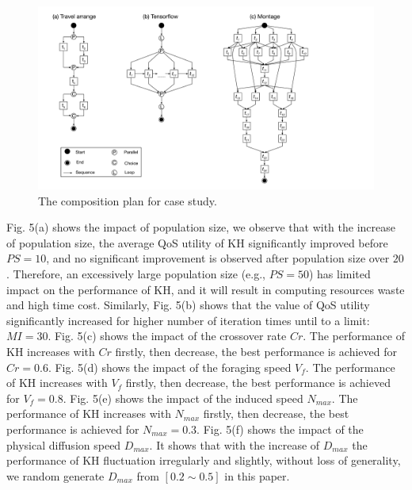 \documentclass[10pt,journal,compsoc]{IEEEtran}
\begin{document}
\begin{figure}[!t]
\centering
\includegraphics[width=5in]{./img/DAG.pdf}
\caption{The composition plan for case study.}
\label{fig_DAG}
\end{figure}

Fig. 5(a) shows the impact of population size, we observe that with the increase of population size, the average QoS utility of KH significantly improved before $PS=10$, and no significant improvement is observed after population size over $20$. Therefore, an excessively large population size (e.g., $PS=50$) has limited impact on the performance of KH, and it will result in computing resources waste and high time cost.
Similarly, Fig. 5(b) shows that the value of QoS utility significantly increased for higher number of iteration times until to a limit: $MI = 30$. 
Fig. 5(c) shows the impact of the crossover rate $Cr$. The performance of KH increases with $Cr$ firstly, then decrease, the best performance is achieved for $Cr = 0.6$.
Fig. 5(d) shows the impact of the foraging speed $V_f$. The performance of KH increases with $V_f$ firstly, then decrease, the best performance is achieved for $V_f = 0.8$.
Fig. 5(e) shows the impact of the induced speed $N_{max}$. The performance of KH increases with $N_{max}$ firstly, then decrease, the best performance is achieved for $N_{max} = 0.3$.
Fig. 5(f) shows the impact of the physical diffusion speed $D_{max}$. It shows that with the increase of $D_{max}$ the performance of KH fluctuation irregularly and slightly, without loss of generality, we random generate $D_{max}$ from $[0.2 \sim 0.5]$ in this paper.
\end{document}
